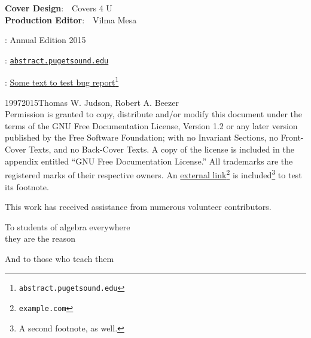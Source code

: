\documentclass[oneside,10pt,]{book}
\numberwithin{equation}{section}
\begin{document}
\par\noindent
\textbf{Cover Design}:\ \ Covers 4 U\\
\textbf{Production Editor}:\ \ Vilma Mesa
\par{}
: Annual Edition 2015\par\medskip
{}: \href{http://abstract.pugetsound.edu}{\nolinkurl{abstract.pugetsound.edu}}\par\medskip
{}: \href{http://abstract.pugetsound.edu}{Some text to test bug report}\footnote{\nolinkurl{abstract.pugetsound.edu}\label{frontmatter-1-9-2}}\par\medskip
\noindent\textcopyright{}1997\textendash{}2015\quad{}Thomas W. Judson, Robert A. Beezer\\[0.5\baselineskip]
Permission is granted to copy, distribute and\slash{}or modify this document under the terms of the GNU Free Documentation License, Version 1.2 or any later version published by the Free Software Foundation; with no Invariant Sections, no Front-Cover Texts, and no Back-Cover Texts.  A copy of the license is included in the appendix entitled ``GNU Free Documentation License.''  All trademarks\texttrademark{} are the registered\textregistered{} marks of their respective owners. An \href{https://example.com}{external link}\footnote{\nolinkurl{example.com}\label{frontmatter-1-10-4-5}} is included\footnote{A second footnote, as well.\label{frontmatter-1-10-4-6}} to test its footnote.\par\medskip
{}
\noindent{}This work has received assistance from numerous volunteer contributors.%
\par
{}
\null\clearpage
\cleardoublepage
\thispagestyle{empty}
\begin{center}\Large%
To students of algebra everywhere\\
 they are the reason%
\end{center}
\begin{center}\Large%
And to those who teach them%
\end{center}
\end{document}

